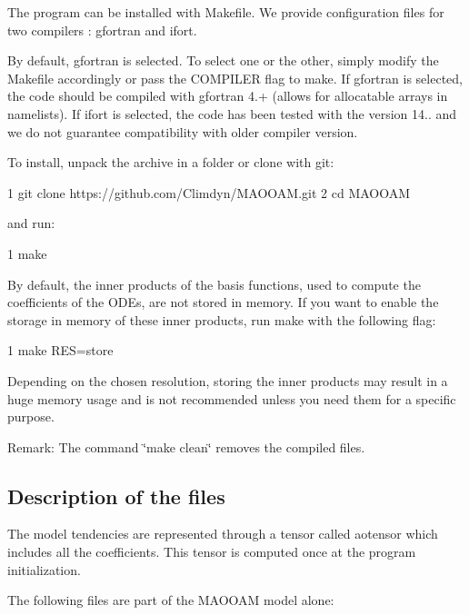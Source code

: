 The program can be installed with Makefile. We provide configuration files for two compilers \+: gfortran and ifort.

By default, gfortran is selected. To select one or the other, simply modify the Makefile accordingly or pass the C\+O\+M\+P\+I\+L\+ER flag to {\ttfamily make}. If gfortran is selected, the code should be compiled with gfortran 4.+ (allows for allocatable arrays in namelists). If ifort is selected, the code has been tested with the version 14.. and we do not guarantee compatibility with older compiler version.

To install, unpack the archive in a folder or clone with git\+:


\begin{DoxyCode}
1 git clone https://github.com/Climdyn/MAOOAM.git
2 cd MAOOAM
\end{DoxyCode}


and run\+:


\begin{DoxyCode}
1 make
\end{DoxyCode}
 By default, the inner products of the basis functions, used to compute the coefficients of the O\+D\+Es, are not stored in memory. If you want to enable the storage in memory of these inner products, run make with the following flag\+:


\begin{DoxyCode}
1 make RES=store
\end{DoxyCode}


Depending on the chosen resolution, storing the inner products may result in a huge memory usage and is not recommended unless you need them for a specific purpose.

Remark\+: The command \char`\"{}make clean\char`\"{} removes the compiled files. 



\subsection*{Description of the files}

The model tendencies are represented through a tensor called aotensor which includes all the coefficients. This tensor is computed once at the program initialization.

The following files are part of the M\+A\+O\+O\+AM model alone\+:


